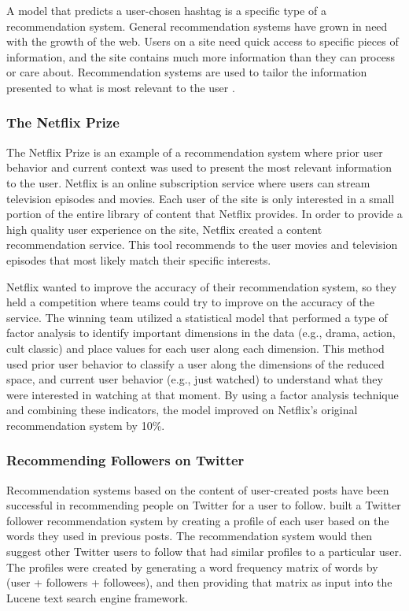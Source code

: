 \documentclass[man,floatsintext,donotrepeattitle]{apa6}
\begin{document}
A model that predicts a user-chosen hashtag is a specific type of a recommendation system.
General recommendation systems have grown in need with the growth of the web.
Users on a site need quick access to specific pieces of information, and the site contains much more information than they can process or care about.
Recommendation systems are used to tailor the information presented to what is most relevant to the user \parencite{Pazzani2007}.

\subsubsection{The Netflix Prize}

The Netflix Prize \parencite{Bennett2007} is an example of a recommendation system where prior user behavior and current context was used to present the most relevant information to the user.
Netflix is an online subscription service where users can stream television episodes and movies.
Each user of the site is only interested in a small portion of the entire library of content that Netflix provides.
In order to provide a high quality user experience on the site, Netflix created a content recommendation service.
This tool recommends to the user movies and television episodes that most likely match their specific interests.

Netflix wanted to improve the accuracy of their recommendation system, so they held a competition where teams could try to improve on the accuracy of the service.
The winning team utilized a statistical model that performed a type of factor analysis to identify important dimensions in the data (e.g., drama, action, cult classic) and place values for each user along each dimension. 
This method used prior user behavior to classify a user along the dimensions of the reduced space, and current user behavior (e.g., just watched) to understand what they were interested in watching at that moment.
By using a factor analysis technique and combining these indicators, the model improved on Netflix's original recommendation system by 10\%.

\subsubsection{Recommending Followers on Twitter}

Recommendation systems based on the content of user-created posts have been successful in recommending people on Twitter for a user to follow.
\textcite{Hannon2010} built a Twitter follower recommendation system by creating a profile of each user based on the words they used in previous posts.
The recommendation system would then suggest other Twitter users to follow that had similar profiles to a particular user.
The profiles were created by generating a word frequency matrix of words by (user + followers + followees), and then providing that matrix as input into the Lucene text search engine framework.
\end{document}
